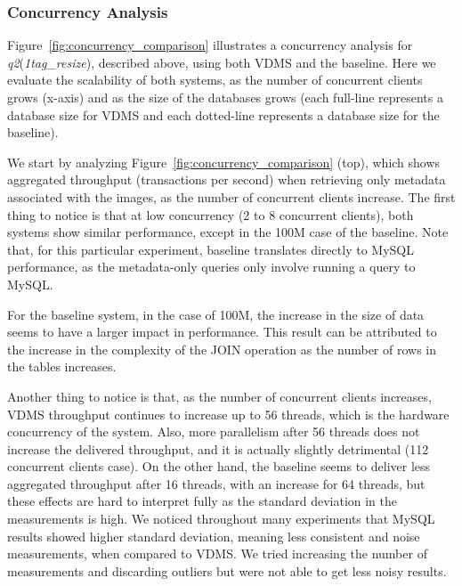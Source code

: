 
\subsubsection{Concurrency Analysis}

Figure~\ref{fig:concurrency_comparison} illustrates a concurrency analysis for
\textit{q2}(\textit{1tag\_resize}), described above,
using both VDMS and the baseline.
Here we evaluate the scalability of both systems, as the number of concurrent
clients grows (x-axis) and as the
size of the databases grows (each full-line represents a database size
for VDMS and each dotted-line represents a database size for the baseline).

We start by analyzing Figure~\ref{fig:concurrency_comparison} (top),
which shows aggregated throughput (transactions per second)
when retrieving only metadata associated with the images, as the number of
concurrent clients increase.
The first thing to notice is that at low concurrency (2 to 8 concurrent clients),
both systems show similar performance, except in the 100M case of the baseline.
Note that, for this particular experiment,
baseline translates directly to MySQL performance,
as the metadata-only queries only involve running a query to MySQL.

For the baseline system, in the case of 100M, the increase in the
size of data seems to have a larger impact in performance.
This result can be attributed to the increase in the complexity of the JOIN
operation as the number of rows in the tables increases.

Another thing to notice is that, as the number of concurrent clients increases,
VDMS throughput continues to increase up to 56 threads, which is
the hardware concurrency of the system.
Also, more parallelism after 56 threads does not increase the delivered throughput,
and it is actually slightly detrimental (112 concurrent clients case).
On the other hand, the baseline seems to deliver less aggregated
throughput after 16 threads, with an increase for 64 threads, but these effects
are hard to interpret fully as the standard deviation in the measurements is high.
We noticed throughout many experiments that MySQL results showed higher
standard deviation, meaning less consistent and noise measurements, when compared
to VDMS.
We tried increasing the number of measurements and discarding
outliers but were not able to get less noisy results.


